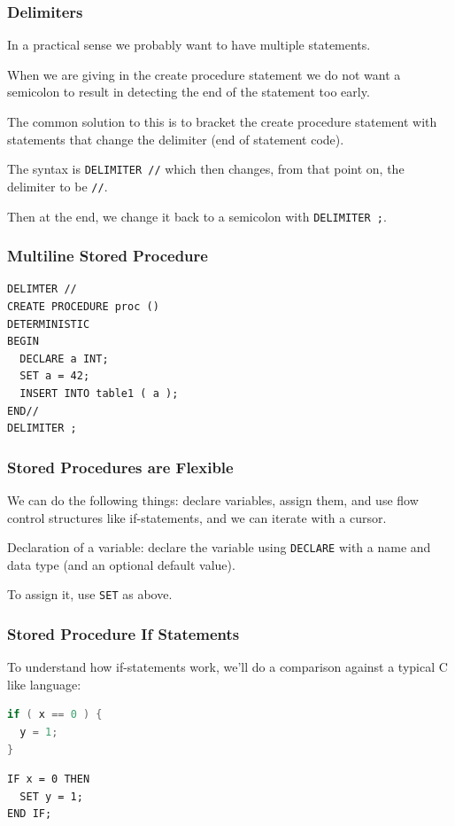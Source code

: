 \begin{frame}
\frametitle{Delimiters}

In a practical sense we probably want to have multiple statements. 

When we are giving in the create procedure statement we do not want a semicolon to result in detecting the end of the statement too early.

The common solution to this is to bracket the create procedure statement with statements that change the delimiter (end of statement code). 

The syntax is \texttt{DELIMITER //} which then changes, from that point on, the delimiter to be \texttt{//}. 
 
Then at the end, we change it back to a semicolon with \texttt{DELIMITER ;}.


\end{frame}

\begin{frame}[fragile]
\frametitle{Multiline Stored Procedure}

{\small
\begin{verbatim}
DELIMTER //
CREATE PROCEDURE proc () 
DETERMINISTIC
BEGIN
  DECLARE a INT;
  SET a = 42;
  INSERT INTO table1 ( a );
END//
DELIMITER ;
\end{verbatim}
}

\end{frame}

\begin{frame}
\frametitle{Stored Procedures are Flexible}
We can do the following things: declare variables, assign them, and use flow control structures like if-statements, and we can iterate with a cursor.

Declaration of a variable: declare the variable using \texttt{DECLARE} with a name and data type (and an optional default value).

To assign it, use \texttt{SET} as above. 


\end{frame}


\begin{frame}[fragile]
\frametitle{Stored Procedure If Statements}

To understand how if-statements work, we'll do a comparison against a typical C like language:

\begin{multicols}{2}
\begin{lstlisting}[language=C]
if ( x == 0 ) {
  y = 1;
} 
\end{lstlisting}
\columnbreak
\begin{verbatim}
IF x = 0 THEN
  SET y = 1;
END IF;
\end{verbatim}
\end{multicols}



\end{frame}


